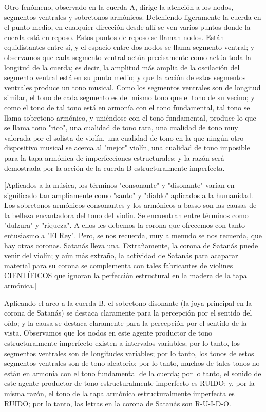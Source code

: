 \documentclass[12pt]{book}
\begin{document}
Otro fenómeno, observado en la cuerda A, dirige la atención a los nodos, segmentos ventrales y sobretonos armónicos. Deteniendo ligeramente la cuerda en el punto medio, en cualquier dirección desde allí se ven varios puntos donde la cuerda está en reposo. Estos puntos de reposo se llaman nodos. Están equidistantes entre sí, y el espacio entre dos nodos se llama segmento ventral; y observamos que cada segmento ventral actúa precisamente como actúa toda la longitud de la cuerda; es decir, la amplitud más amplia de la oscilación del segmento ventral está en su punto medio; y que la acción de estos segmentos ventrales produce un tono musical. Como los segmentos ventrales son de longitud similar, el tono de cada segmento es del mismo tono que el tono de su vecino; y como el tono de tal tono está en armonía con el tono fundamental, tal tono se llama sobretono armónico, y uniéndose con el tono fundamental, produce lo que se llama tono "rico", una cualidad de tono rara, una cualidad de tono muy valorada por el solista de violín, una cualidad de tono en la que ningún otro dispositivo musical se acerca al "mejor" violín, una cualidad de tono imposible para la tapa armónica de imperfecciones estructurales; y la razón será demostrada por la acción de la cuerda B estructuralmente imperfecta.

[Aplicados a la música, los términos "consonante" y "disonante" varían en significado tan ampliamente como "santo" y "diablo" aplicados a la humanidad. Los sobretonos armónicos consonantes y los armónicos a basso son las causas de la belleza encantadora del tono del violín. Se encuentran entre términos como "dulzura" y "riqueza". A ellos les debemos la corona que ofrecemos con tanto entusiasmo a "El Rey". Pero, se nos recuerda, muy a menudo se nos recuerda, que hay otras coronas. Satanás lleva una. Extrañamente, la corona de Satanás puede venir del violín; y aún más extraño, la actividad de Satanás para acaparar material para su corona se complementa con tales fabricantes de violines CIENTÍFICOS que ignoran la perfección estructural en la madera de la tapa armónica.]

Aplicando el arco a la cuerda B, el sobretono disonante (la joya principal en la corona de Satanás) se destaca claramente para la percepción por el sentido del oído; y la causa se destaca claramente para la percepción por el sentido de la vista. Observamos que los nodos en este agente productor de tono estructuralmente imperfecto existen a intervalos variables; por lo tanto, los segmentos ventrales son de longitudes variables; por lo tanto, los tonos de estos segmentos ventrales son de tono aleatorio; por lo tanto, muchos de tales tonos no están en armonía con el tono fundamental de la cuerda; por lo tanto, el sonido de este agente productor de tono estructuralmente imperfecto es RUIDO; y, por la misma razón, el tono de la tapa armónica estructuralmente imperfecta es RUIDO; por lo tanto, las letras en la corona de Satanás son R-U-I-D-O.
\end{document}
